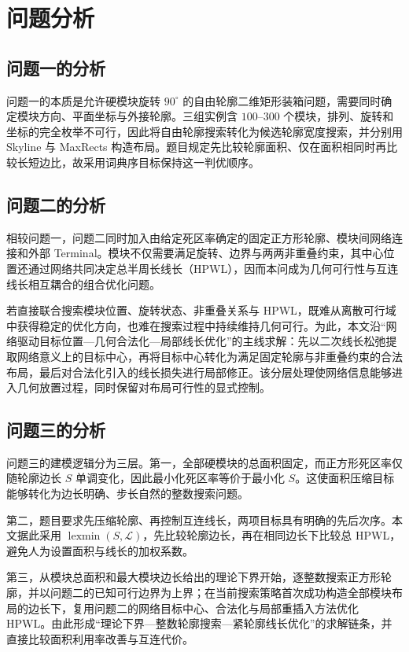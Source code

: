 \section{问题分析}

\subsection{问题一的分析}

问题一的本质是允许硬模块旋转 $90^\circ$ 的自由轮廓二维矩形装箱问题，需要同时确定模块方向、平面坐标与外接轮廓。三组实例含 $100$--$300$ 个模块，排列、旋转和坐标的完全枚举不可行，因此将自由轮廓搜索转化为候选轮廓宽度搜索，并分别用 Skyline 与 MaxRects 构造布局。题目规定先比较轮廓面积、仅在面积相同时再比较长短边比，故采用词典序目标保持这一判优顺序。

\subsection{问题二的分析}

相较问题一，问题二同时加入由给定死区率确定的固定正方形轮廓、模块间网络连接和外部 Terminal。模块不仅需要满足旋转、边界与两两非重叠约束，其中心位置还通过网络共同决定总半周长线长（HPWL），因而本问成为几何可行性与互连线长相互耦合的组合优化问题。

若直接联合搜索模块位置、旋转状态、非重叠关系与 HPWL，既难从离散可行域中获得稳定的优化方向，也难在搜索过程中持续维持几何可行。为此，本文沿“网络驱动目标位置—几何合法化—局部线长优化”的主线求解：先以二次线长松弛提取网络意义上的目标中心，再将目标中心转化为满足固定轮廓与非重叠约束的合法布局，最后对合法化引入的线长损失进行局部修正。该分层处理使网络信息能够进入几何放置过程，同时保留对布局可行性的显式控制。

\subsection{问题三的分析}

问题三的建模逻辑分为三层。第一，全部硬模块的总面积固定，而正方形死区率仅随轮廓边长 $S$ 单调变化，因此最小化死区率等价于最小化 $S$。这使面积压缩目标能够转化为边长明确、步长自然的整数搜索问题。

第二，题目要求先压缩轮廓、再控制互连线长，两项目标具有明确的先后次序。本文据此采用 $\operatorname{lexmin}(S,\mathcal{L})$，先比较轮廓边长，再在相同边长下比较总 HPWL，避免人为设置面积与线长的加权系数。

第三，从模块总面积和最大模块边长给出的理论下界开始，逐整数搜索正方形轮廓，并以问题二的已知可行边界为上界；在当前搜索策略首次成功构造全部模块布局的边长下，复用问题二的网络目标中心、合法化与局部重插入方法优化 HPWL。由此形成“理论下界---整数轮廓搜索---紧轮廓线长优化”的求解链条，并直接比较面积利用率改善与互连代价。

